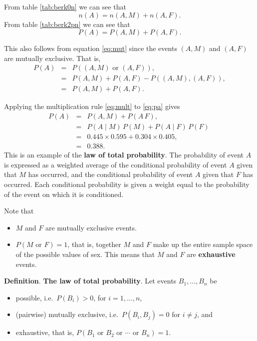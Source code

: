 \documentclass[
  11pt,
  british,
  openany, a4paper]{book}
\providecommand{\tightlist}{%
  \setlength{\itemsep}{0pt}\setlength{\parskip}{0pt}}
\begin{document}
From table \ref{tab:berk0n} we can see that
\[ n(A) = n(A , M) + n(A , F). \]
From table \ref{tab:berk2pn} we can see that
\begin{equation}
P(A) = P(A , M) + P(A , F). 
\label{eq:pa}
\end{equation}

This also follows from equation \eqref{eq:mut} since the events \((A , M)\) and \((A , F)\) are mutually exclusive. That is,
\begin{eqnarray}
 P(A) &=& P((A , M) \mbox{ or } (A , F) ), \\
 &=& P(A , M) + P(A , F) - P((A , M) , (A , F)), \\
 &=& P(A , M) + P(A , F). 
\end{eqnarray}

Applying the multiplication rule \eqref{eq:mult} to \eqref{eq:pa} gives
\begin{eqnarray}
P(A) &=& P(A , M) + P(A \, F), \\
     &=& P(A \mid M)\,P(M) + P(A \mid F)\,P(F)\ \\
     &=& 0.445 \times 0.595 + 0.304 \times 0.405, \\
     &=& 0.388.
\end{eqnarray}
This is an example of the \textbf{law of total probability}. The probability of event \(A\) is expressed as a weighted average of the conditional probability of event \(A\) given that \(M\) has occurred, and the conditional probability of event \(A\) given that \(F\) has occurred. Each conditional probability is given a weight equal to the probability of the event on which it is conditioned.

Note that

\begin{itemize}
\tightlist
\item
  \(M\) and \(F\) are mutually exclusive events.
\item
  \(P(M \mbox{ or } F) = 1\), that is, together \(M\) and \(F\) make up the entire sample space of the possible values of sex. This means that \(M\) and \(F\) are \textbf{exhaustive} events.
\end{itemize}

\textbf{Definition}. \textbf{The law of total probability}. Let events \(B_1, \ldots, B_n\) be

\begin{itemize}
\tightlist
\item
  possible, i.e.~\(P(B_i) > 0\), for \(i = 1, \ldots, n\),
\item
  (pairwise) mutually exclusive, i.e.~\(P(B_i , B_j)=0\) for \(i \neq j\), and
\item
  exhaustive, that is, \(P(B_1 \mbox{ or } B_2 \mbox{ or } \cdots \mbox{ or } B_n) = 1\).
\end{itemize}
\end{document}
